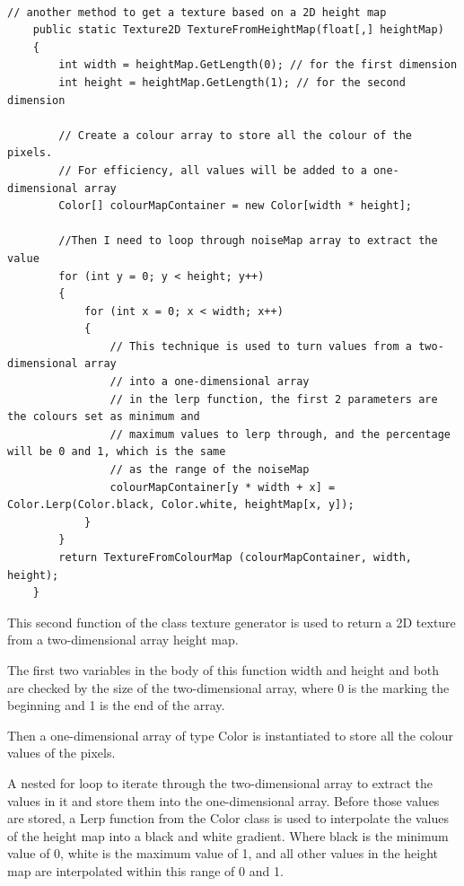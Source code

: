 \documentclass[a4paper,12pt]{book}
\begin{document}
\begin{lstlisting}

// another method to get a texture based on a 2D height map
    public static Texture2D TextureFromHeightMap(float[,] heightMap)
    {
        int width = heightMap.GetLength(0); // for the first dimension
        int height = heightMap.GetLength(1); // for the second dimension

        // Create a colour array to store all the colour of the pixels.
        // For efficiency, all values will be added to a one-dimensional array
        Color[] colourMapContainer = new Color[width * height];

        //Then I need to loop through noiseMap array to extract the value
        for (int y = 0; y < height; y++)
        {
            for (int x = 0; x < width; x++)
            {
                // This technique is used to turn values from a two-dimensional array
                // into a one-dimensional array
                // in the lerp function, the first 2 parameters are the colours set as minimum and
                // maximum values to lerp through, and the percentage will be 0 and 1, which is the same
                // as the range of the noiseMap
                colourMapContainer[y * width + x] = Color.Lerp(Color.black, Color.white, heightMap[x, y]);
            }
        }
        return TextureFromColourMap (colourMapContainer, width, height);
    }

\end{lstlisting}

This second function of the class texture generator is used to return a 2D texture from a two-dimensional array height map.

The first two variables in the body of this function width and height and both are checked by the size of the two-dimensional array, where 0 is the marking the beginning and 1 is the end of the array.

Then a one-dimensional array of type Color is instantiated to store all the colour values of the pixels.

A nested for loop to iterate through the two-dimensional array to extract the values in it and store them into the one-dimensional array. Before those values are stored, a Lerp function from the Color class is used to interpolate the values of the height map into a black and white gradient. Where black is the minimum value of 0, white is the maximum value of 1, and all other values in the height map are interpolated within this range of 0 and 1.
\end{document}
